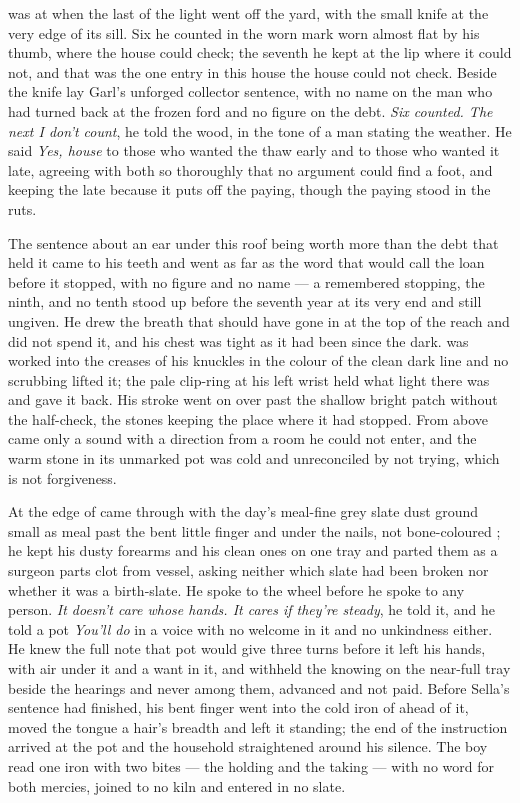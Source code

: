  was at  when the last of the light went off the yard, with the small knife at the very edge of its sill. Six he counted in the worn mark worn almost flat by his thumb, where the house could check; the seventh he kept at the lip where it could not, and that was the one entry in this house the house could not check. Beside the knife lay Garl's unforged collector sentence, with no name on the man who had turned back at the frozen ford and no figure on the debt. \emph{Six counted. The next I don't count}, he told the wood, in the tone of a man stating the weather. He said \emph{Yes, house} to those who wanted the thaw early and to those who wanted it late, agreeing with both so thoroughly that no argument could find a foot, and keeping the late because it puts off the paying, though the paying stood in the ruts.

The sentence about an ear under this roof being worth more than the debt that held it came to his teeth and went as far as the word that would call the loan before it stopped, with no figure and no name --- a remembered stopping, the ninth, and no tenth stood up before the seventh year at its very end and still ungiven. He drew the breath that should have gone in at the top of the reach and did not spend it, and his chest was tight as it had been since the dark.  was worked into the creases of his knuckles in the colour of the clean dark line and no scrubbing lifted it; the pale clip-ring at his left wrist held what light there was and gave it back. His stroke went on over  past the shallow bright patch without the half-check, the stones keeping the place where it had stopped. From above came only a sound with a direction from a room he could not enter, and the warm stone in its unmarked pot was cold and unreconciled by not trying, which is not forgiveness.

At the edge of   came through with the day's meal-fine grey slate dust ground small as meal past the bent little finger and under the nails, not bone-coloured ; he kept his dusty forearms and his clean ones on one tray and parted them as a surgeon parts clot from vessel, asking neither which slate had been broken nor whether it was a birth-slate. He spoke to the wheel before he spoke to any person. \emph{It doesn't care whose hands. It cares if they're steady}, he told it, and he told a pot \emph{You'll do} in a voice with no welcome in it and no unkindness either. He knew the full note that pot would give three turns before it left his hands, with air under it and a want in it, and withheld the knowing on the near-full tray beside the hearings and never among them, advanced and not paid. Before Sella's sentence had finished, his bent finger went into the cold iron of  ahead of it, moved the tongue a hair's breadth and left it standing; the end of the instruction arrived at the pot and the household straightened around his silence. The boy read one iron with two bites --- the holding and the taking --- with no  word for both mercies, joined to no kiln and entered in no slate.

